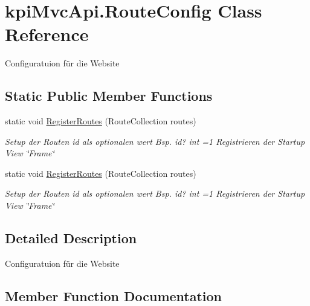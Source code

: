 \hypertarget{classkpi_mvc_api_1_1_route_config}{}\section{kpi\+Mvc\+Api.\+Route\+Config Class Reference}
\label{classkpi_mvc_api_1_1_route_config}


Configuratuion für die Website  


\subsection*{Static Public Member Functions}
\begin{DoxyCompactItemize}
\item 
static void \hyperlink{classkpi_mvc_api_1_1_route_config_a7695727c1d42e9d813eb3c0c63802ec3}{Register\+Routes} (Route\+Collection routes)
\begin{DoxyCompactList}\small\item\em Setup der Routen id als optionalen wert Bsp. id? int =1 Registrieren der Startup View \char`\"{}\+Frame\char`\"{} \end{DoxyCompactList}\item 
static void \hyperlink{classkpi_mvc_api_1_1_route_config_a7695727c1d42e9d813eb3c0c63802ec3}{Register\+Routes} (Route\+Collection routes)
\begin{DoxyCompactList}\small\item\em Setup der Routen id als optionalen wert Bsp. id? int =1 Registrieren der Startup View \char`\"{}\+Frame\char`\"{} \end{DoxyCompactList}\end{DoxyCompactItemize}


\subsection{Detailed Description}
Configuratuion für die Website 



\subsection{Member Function Documentation}
\mbox{\label{classkpi_mvc_api_1_1_route_config_a7695727c1d42e9d813eb3c0c63802ec3}} 
